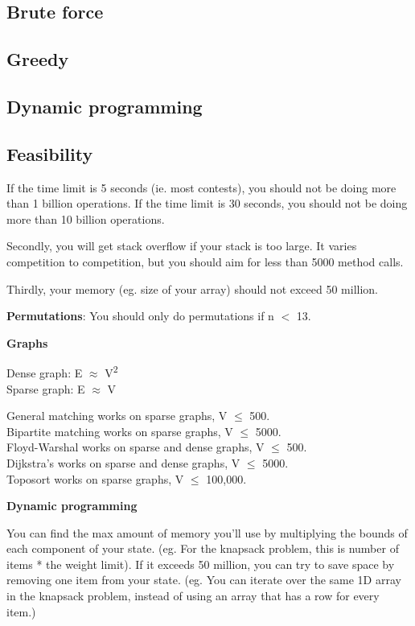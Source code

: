 
\subsection*{Brute force}

\subsection*{Greedy}

\subsection*{Dynamic programming}

\subsection*{Feasibility}

If the time limit is 5 seconds (ie. most contests), you should not be doing more than 1 billion operations. If the time limit is 30 seconds, you should not be doing more than 10 billion operations.

Secondly, you will get stack overflow if your stack is too large. It varies competition to competition, but you should aim for less than 5000 method calls.

Thirdly, your memory (eg. size of your array) should not exceed 50 million.

\textbf{Permutations}: You should only do permutations if n $<$ 13.

\textbf{Graphs}

Dense graph: E $\approx$ V\textsuperscript{2} \\
Sparse graph: E $\approx$ V

General matching works on sparse graphs, V $\leq$ 500. \\
Bipartite matching works on sparse graphs, V $\leq$ 5000. \\
Floyd-Warshal works on sparse and dense graphs, V $\leq$ 500. \\
Dijkstra’s works on sparse and dense graphs, V $\leq$ 5000. \\
Toposort works on sparse graphs, V $\leq$ 100,000.

\textbf{Dynamic programming}

You can find the max amount of memory you’ll use by multiplying the bounds of each component of your state. (eg. For the knapsack problem, this is number of items * the weight limit). If it exceeds 50 million, you can try to save space by removing one item from your state. (eg. You can iterate over the same 1D array in the knapsack problem, instead of using an array that has a row for every item.)


